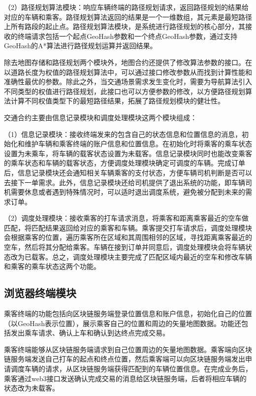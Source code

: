 （2）路径规划算法模块：响应车辆终端的路径规划请求，返回路径规划的结果给对应的车辆和乘客。路径规划算法返回的结果是一个一维数组，其元素是最短路径上所有路段的起止点。路径规划算法模块，是系统进行路径规划的核心部分，其接收的终端请求包括一个起点GeoHash参数和一个终点GeoHash参数，通过支持GeoHash的A*算法进行路径规划运算并返回结果。

除去地图存储和路径规划两个模块外，地图合约还提供了修改算法参数的接口。在以道路长度为权值的路径规划算法中，可以通过接口修改参数从而找到计算性能和准确性最优的参数。除此之外，当交通场景需求发生变化时，需要为导航算法引入不同类型的权值进行路径规划，此接口也可以方便参数的修改，以方便路径规划算法计算不同权值类型下的最短路径结果，拓展了路径规划模块的健壮性。

交通合约主要由信息记录模块和调度处理模块这两个模块组成：

（1）信息记录模块：接收终端发来的包含自己的状态信息和位置信息的消息，初始化和维护车辆和乘客终端的账户信息和位置信息。在初始化时将乘客的乘车状态设置为未乘车，将车辆的载客状态设置为未载客。信息记录模块同时也能改变乘客的乘车状态和车辆的载客状态，方便调度处理模块确定可调度的车辆。完成订单后，信息记录模块还会通知相关车辆乘客的支付状态，方便车辆司机判断是否可以去接下一单需求。此外，信息记录模块还给司机提供了退出系统的功能，即车辆司机需要休息或者遇到特殊情况时，可以适时退出调度系统，避免被分配到未来的需求订单。

（2）调度处理模块：接收乘客的打车请求消息，将乘客和距离乘客最近的空车做匹配，将匹配结果返回给对应的乘客和车辆。乘客提交打车请求后，调度处理模块会根据乘客的位置，遍历乘客所在区域和其周围相邻的区域，寻找距离乘客最近的空车，然后将其分配给乘客。车辆在接到订单并同意后，调度处理模块会将车辆状态改为已载客。总之，调度处理模块主要完成了匹配区域内最近的空车和修改车辆和乘客的乘车状态这两个功能。


\subsection{浏览器终端模块}
乘客终端的功能包括向区块链服务端登录位置信息和账户信息，初始化自己的位置（以GeoHash表示位置），展示乘客自己的位置和周边的矢量地图数据。功能还包括发出乘车请求、确认上车和确认到达终点完成交易。

乘客终端能够从区块链服务端请求到自己位置周边的矢量地图数据。乘客端向区块链服务端发送自己打车的起点和终点位置，然后乘客端可以向区块链服务端发出申请调度车辆的请求，从区块链服务端获得匹配到的车辆位置信息。在完成业务后，乘客通过web3接口发送确认完成交易的消息给区块链服务端，后者将相应车辆的状态改为未载客。

